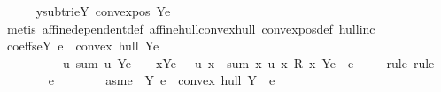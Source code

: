 \begin{isabellebody}
\ \ \ \ \isamarkupfalse%
\ y{\isacharunderscore}{\kern0pt}sub{\isacharunderscore}{\kern0pt}tri{\isacharcolon}{\kern0pt}{\isachardoublequoteopen}{\isasymforall}e{\isasymin}Y{\isachardot}{\kern0pt}\ convex{\isacharunderscore}{\kern0pt}pos\ {\isacharparenleft}{\kern0pt}Y{\isacharminus}{\kern0pt}{\isacharbraceleft}{\kern0pt}e{\isacharbraceright}{\kern0pt}{\isacharparenright}{\kern0pt}{\isachardoublequoteclose}\isanewline
\ \ \ \ \ \ \isamarkupfalse%
\ {\isacharparenleft}{\kern0pt}metis\ affine{\isacharunderscore}{\kern0pt}dependent{\isacharunderscore}{\kern0pt}def\ affine{\isacharunderscore}{\kern0pt}hull{\isacharunderscore}{\kern0pt}convex{\isacharunderscore}{\kern0pt}hull\ convex{\isacharunderscore}{\kern0pt}pos{\isacharunderscore}{\kern0pt}def\ hull{\isacharunderscore}{\kern0pt}inc{\isacharparenright}{\kern0pt}\isanewline
\ \ \ \ \isamarkupfalse%
\ coeffs{\isacharcolon}{\kern0pt}{\isachardoublequoteopen}{\isasymforall}e{\isasymin}Y{\isachardot}{\kern0pt}\ e\ {\isasymin}\ convex\ hull\ {\isacharparenleft}{\kern0pt}Y{\isacharminus}{\kern0pt}{\isacharbraceleft}{\kern0pt}e{\isacharbraceright}{\kern0pt}{\isacharparenright}{\kern0pt}\ {\isasymlongrightarrow}\isanewline
\ \ \ \ \ \ \ \ \ \ {\isacharparenleft}{\kern0pt}{\isasymexists}u{\isachardot}{\kern0pt}\ {\isacharparenleft}{\kern0pt}sum\ u\ {\isacharparenleft}{\kern0pt}Y{\isacharminus}{\kern0pt}{\isacharbraceleft}{\kern0pt}e{\isacharbraceright}{\kern0pt}{\isacharparenright}{\kern0pt}\ {\isacharequal}{\kern0pt}\ {}{\isacharparenright}{\kern0pt}\ {\isasymand}\ {\isacharparenleft}{\kern0pt}{\isasymforall}x{\isasymin}{\isacharparenleft}{\kern0pt}Y{\isacharminus}{\kern0pt}{\isacharbraceleft}{\kern0pt}e{\isacharbraceright}{\kern0pt}{\isacharparenright}{\kern0pt}{\isachardot}{\kern0pt}\ {}\ {\isacharless}{\kern0pt}\ u\ x{\isacharparenright}{\kern0pt}\ {\isasymand}\ sum\ {\isacharparenleft}{\kern0pt}{\isasymlambda}x{\isachardot}{\kern0pt}\ u\ x\ {\isacharasterisk}{\kern0pt}\isactrlsub R\ x{\isacharparenright}{\kern0pt}\ {\isacharparenleft}{\kern0pt}Y{\isacharminus}{\kern0pt}{\isacharbraceleft}{\kern0pt}e{\isacharbraceright}{\kern0pt}{\isacharparenright}{\kern0pt}\ {\isacharequal}{\kern0pt}\ e{\isacharparenright}{\kern0pt}{\isachardoublequoteclose}\isanewline
\ \ \ \ \isamarkupfalse%
{\isacharparenleft}{\kern0pt}rule{\isacharcomma}{\kern0pt}\ rule{\isacharparenright}{\kern0pt}\isanewline
\ \ \ \ \ \ \isamarkupfalse%
\ e\isanewline
\ \ \ \ \ \ \isamarkupfalse%
\ asm{\isacharcolon}{\kern0pt}{\isachardoublequoteopen}e\ {\isasymin}\ Y{\isachardoublequoteclose}\ {\isachardoublequoteopen}e\ {\isasymin}\ convex\ hull\ {\isacharparenleft}{\kern0pt}Y\ {\isacharminus}{\kern0pt}\ {\isacharbraceleft}{\kern0pt}e{\isacharbraceright}{\kern0pt}{\isacharparenright}{\kern0pt}{\isachardoublequoteclose}\isanewline

\end{isabellebody}
